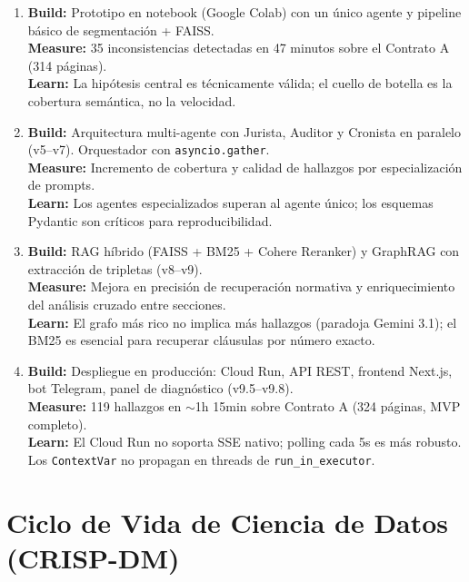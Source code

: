 \begin{enumerate}
    \item \textbf{Build:} Prototipo en notebook (Google Colab) con un único
    agente y pipeline básico de segmentación + FAISS.\\
    \textbf{Measure:} 35 inconsistencias detectadas en 47 minutos sobre el
    Contrato A (314 páginas).\\
    \textbf{Learn:} La hipótesis central es técnicamente válida; el cuello de
    botella es la cobertura semántica, no la velocidad.

    \item \textbf{Build:} Arquitectura multi-agente con Jurista, Auditor y
    Cronista en paralelo (v5--v7). Orquestador con \texttt{asyncio.gather}.\\
    \textbf{Measure:} Incremento de cobertura y calidad de hallazgos por
    especialización de prompts.\\
    \textbf{Learn:} Los agentes especializados superan al agente único; los
    esquemas Pydantic son críticos para reproducibilidad.

    \item \textbf{Build:} RAG híbrido (FAISS + BM25 + Cohere Reranker) y
    GraphRAG con extracción de tripletas (v8--v9).\\
    \textbf{Measure:} Mejora en precisión de recuperación normativa y
    enriquecimiento del análisis cruzado entre secciones.\\
    \textbf{Learn:} El grafo más rico no implica más hallazgos (paradoja
    Gemini 3.1); el BM25 es esencial para recuperar cláusulas por número exacto.

    \item \textbf{Build:} Despliegue en producción: Cloud Run, API REST,
    frontend Next.js, bot Telegram, panel de diagnóstico (v9.5--v9.8).\\
    \textbf{Measure:} 119 hallazgos en $\sim$1h 15min sobre Contrato A
    (324 páginas, MVP completo).\\
    \textbf{Learn:} El Cloud Run no soporta SSE nativo; polling cada 5s es
    más robusto. Los \texttt{ContextVar} no propagan en threads de
    \texttt{run\_in\_executor}.
\end{enumerate}

\section{Ciclo de Vida de Ciencia de Datos (CRISP-DM)}

